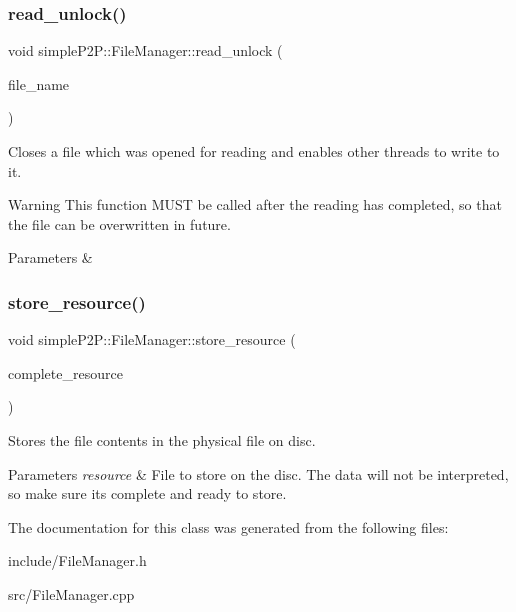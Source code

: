 \subsubsection{\texorpdfstring{read\+\_\+unlock()}{read\_unlock()}}
{\footnotesize\ttfamily void simple\+P2\+P\+::\+File\+Manager\+::read\+\_\+unlock (\begin{DoxyParamCaption}\item[{const std\+::string}]{file\+\_\+name }\end{DoxyParamCaption})}



Closes a file which was opened for reading and enables other threads to write to it. 

\begin{DoxyWarning}{Warning}
This function M\+U\+ST be called after the reading has completed, so that the file can be overwritten in future.
\end{DoxyWarning}

\begin{DoxyParams}{Parameters}
{\em } & \\
\hline
\end{DoxyParams}
\mbox{\label{classsimpleP2P_1_1FileManager_a120fec780f9a6bf350ffbac731376213}} 
\subsubsection{\texorpdfstring{store\+\_\+resource()}{store\_resource()}}
{\footnotesize\ttfamily void simple\+P2\+P\+::\+File\+Manager\+::store\+\_\+resource (\begin{DoxyParamCaption}\item[{std\+::shared\+\_\+ptr$<$ \hyperlink{classsimpleP2P_1_1CompleteResource}{Complete\+Resource} $>$}]{complete\+\_\+resource }\end{DoxyParamCaption})}



Stores the file contents in the physical file on disc. 


\begin{DoxyParams}{Parameters}
{\em resource} & File to store on the disc. The data will not be interpreted, so make sure it\textquotesingle{}s complete and ready to store. \\
\hline
\end{DoxyParams}


The documentation for this class was generated from the following files\+:\begin{DoxyCompactItemize}
\item 
include/File\+Manager.\+h\item 
src/File\+Manager.\+cpp\end{DoxyCompactItemize}
